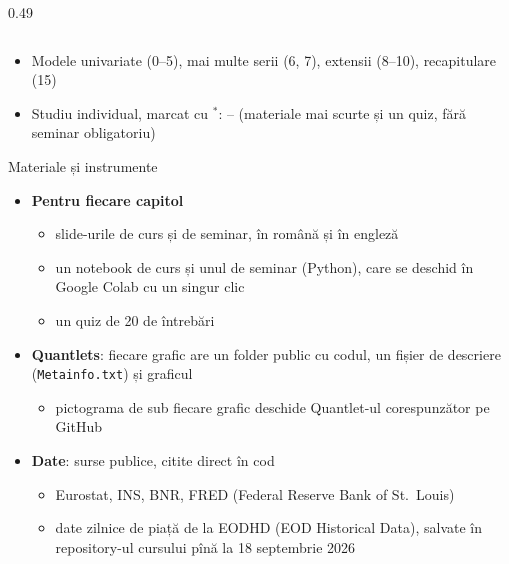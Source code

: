 \begin{frame}
\begin{columns}[T]
\begin{column}{0.49\textwidth}
\end{column}
\end{columns}
\begin{itemize}
    \item Modele univariate (0--5), mai multe serii (6, 7), extensii (8--10), recapitulare (15)
    \item Studiu individual, marcat cu $^*$: -- (materiale mai scurte și un quiz, fără seminar obligatoriu)
\end{itemize}
\end{frame}

\begin{frame}{Materiale și instrumente}
\itemsize{\small}
\begin{itemize}
    \item \textbf{Pentru fiecare capitol}
    \begin{itemize}
        \item slide-urile de curs și de seminar, în română și în engleză
        \item un notebook de curs și unul de seminar (Python), care se deschid în Google Colab cu un singur clic
        \item un quiz de 20 de întrebări
    \end{itemize}
    \item \textbf{Quantlets}: fiecare grafic are un folder public cu codul, un fișier de descriere (\texttt{Metainfo.txt}) și graficul
    \begin{itemize}
        \item pictograma de sub fiecare grafic deschide Quantlet-ul corespunzător pe GitHub
    \end{itemize}
    \item \textbf{Date}: surse publice, citite direct în cod
    \begin{itemize}
        \item Eurostat, INS, BNR, FRED (Federal Reserve Bank of St.\ Louis)
        \item date zilnice de piață de la EODHD (EOD Historical Data), salvate în repository-ul cursului pînă la 18 septembrie 2026
    \end{itemize}
\end{itemize}
\end{frame}

